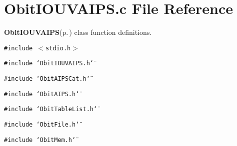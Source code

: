 \section{Obit\-IOUVAIPS.c File Reference}
\label{ObitIOUVAIPS_8c}
{\bf Obit\-IOUVAIPS}{\rm (p.\,\pageref{structObitIOUVAIPS})} class function definitions. 

{\tt \#include $<$stdio.h$>$}\par
{\tt \#include \char`\"{}Obit\-IOUVAIPS.h\char`\"{}}\par
{\tt \#include \char`\"{}Obit\-AIPSCat.h\char`\"{}}\par
{\tt \#include \char`\"{}Obit\-AIPS.h\char`\"{}}\par
{\tt \#include \char`\"{}Obit\-Table\-List.h\char`\"{}}\par
{\tt \#include \char`\"{}Obit\-File.h\char`\"{}}\par
{\tt \#include \char`\"{}Obit\-Mem.h\char`\"{}}\par
